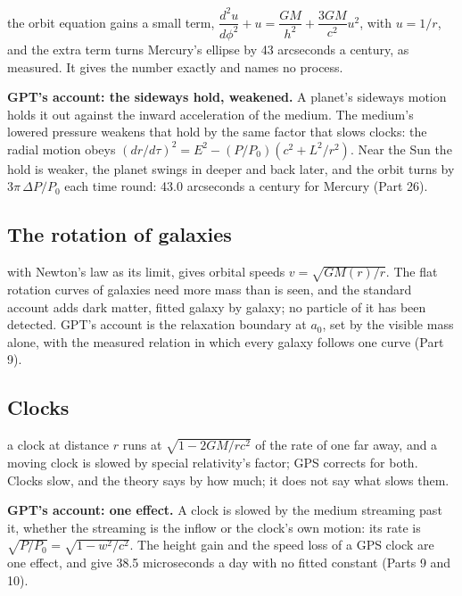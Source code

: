  the orbit equation gains a small term, $\dfrac{d^2u}{d\phi^2} + u = \dfrac{GM}{h^2} + \dfrac{3GM}{c^2}u^2$, with $u = 1/r$, and the extra term turns Mercury's ellipse by 43 arcseconds a century, as measured. It gives the number exactly and names no process.

\begin{hypbar}
\textbf{GPT's account: the sideways hold, weakened.} A planet's sideways motion holds it out against the inward acceleration of the medium. The medium's lowered pressure weakens that hold by the same factor that slows clocks: the radial motion obeys $(dr/d\tau)^2 = E^2 - (P/P_0)(c^2 + L^2/r^2)$. Near the Sun the hold is weaker, the planet swings in deeper and back later, and the orbit turns by $3\pi\,\Delta P/P_0$ each time round: 43.0 arcseconds a century for Mercury (Part 26).\footnotemark{}
\end{hypbar}

\subsection{The rotation of galaxies}

 with Newton's law as its limit, gives orbital speeds $v = \sqrt{GM(r)/r}$. The flat rotation curves of galaxies need more mass than is seen, and the standard account adds dark matter, fitted galaxy by galaxy; no particle of it has been detected. GPT's account is the relaxation boundary at $a_0$, set by the visible mass alone, with the measured relation in which every galaxy follows one curve (Part 9).

\subsection{Clocks}

 a clock at distance $r$ runs at $\sqrt{1-2GM/rc^2}$ of the rate of one far away, and a moving clock is slowed by special relativity's factor; GPS corrects for both. Clocks slow, and the theory says by how much; it does not say what slows them.

\begin{hypbar}
\textbf{GPT's account: one effect.} A clock is slowed by the medium streaming past it, whether the streaming is the inflow or the clock's own motion: its rate is $\sqrt{P/P_0} = \sqrt{1-w^2/c^2}$. The height gain and the speed loss of a GPS clock are one effect, and give 38.5 microseconds a day with no fitted constant (Parts 9 and 10).\footnotemark{}
\end{hypbar}

